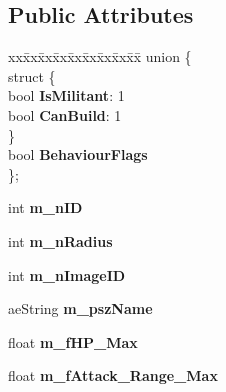 \subsection*{Public Attributes}
\begin{DoxyCompactItemize}
\item 
\begin{tabbing}
xx\=xx\=xx\=xx\=xx\=xx\=xx\=xx\=xx\=\kill
union \{\\
\>struct \{\\
\>\>bool {\bfseries IsMilitant}: 1\\
\>\>bool {\bfseries CanBuild}: 1\\
\>\} \hypertarget{unionae_unit_type_1_1_0D42_a99acaf3c4289cb6f97709bcc8f16a735}{}\label{unionae_unit_type_1_1_0D42_a99acaf3c4289cb6f97709bcc8f16a735}
\\
\>bool {\bfseries BehaviourFlags}\\
\}; \hypertarget{classae_unit_type_a0546ed04de220f2de4638774be84119d}{}\label{classae_unit_type_a0546ed04de220f2de4638774be84119d}
\\

\end{tabbing}\item 
int {\bfseries m\+\_\+n\+ID}\hypertarget{classae_unit_type_a5f86adb71d05c12f5a60f8dc3a7b37e5}{}\label{classae_unit_type_a5f86adb71d05c12f5a60f8dc3a7b37e5}

\item 
int {\bfseries m\+\_\+n\+Radius}\hypertarget{classae_unit_type_a9651b91c590e29b5d2f78771b53c2c08}{}\label{classae_unit_type_a9651b91c590e29b5d2f78771b53c2c08}

\item 
int {\bfseries m\+\_\+n\+Image\+ID}\hypertarget{classae_unit_type_a4f160385b754f3cde47d9b2dbe862457}{}\label{classae_unit_type_a4f160385b754f3cde47d9b2dbe862457}

\item 
ae\+String {\bfseries m\+\_\+psz\+Name}\hypertarget{classae_unit_type_a30066454b57ef80410de6169e6cc5ccb}{}\label{classae_unit_type_a30066454b57ef80410de6169e6cc5ccb}

\item 
float {\bfseries m\+\_\+f\+H\+P\+\_\+\+Max}\hypertarget{classae_unit_type_aca7918ed07a1484cdf3b424e0d8c279a}{}\label{classae_unit_type_aca7918ed07a1484cdf3b424e0d8c279a}

\item 
float {\bfseries m\+\_\+f\+Attack\+\_\+\+Range\+\_\+\+Max}\hypertarget{classae_unit_type_a90884afa6cd494f398e0ded9fec26dd8}{}\label{classae_unit_type_a90884afa6cd494f398e0ded9fec26dd8}


\end{DoxyCompactItemize}
